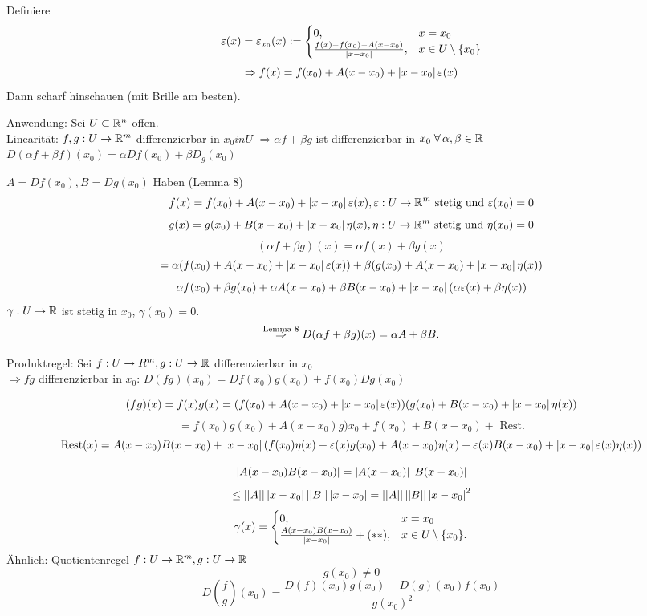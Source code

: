 \documentclass[../ana2.tex]{subfiles}
\begin{document}
\begin{bew}
    Definiere 
    \[ \varepsilon(x) = \varepsilon_{x_0}(x) 
    := \begin{cases}
        0, & x = x_0 \\
        \frac{f(x) - f(x_0) - A(x - x_0)}{\left|x - x_0\right|}, & x\in U \setminus \{x_0\}
    \end{cases} \]
    \[ \Rightarrow f(x) = f(x_0) + A(x - x_0) + \left|x - x_0\right| \varepsilon(x) \]
    Dann scharf hinschauen (mit Brille am besten).
\end{bew}
Anwendung: Sei \( U \subset \mathbb{R}^n \) offen. \\
Linearität: \( f,g:U\rightarrow \mathbb{R}^m \) differenzierbar in \(x_0 in U\)
\( \Rightarrow \alpha f + \beta g \) ist differenzierbar in 
\(x_0 \; \forall \alpha, \beta \in \R\) \\
\( D(\alpha f + \beta f)(x_0) = \alpha Df(x_0) + \beta D_g(x_0) \)
\begin{bew}
    \( A = Df (x_0), B = Dg(x_0) \)
    Haben (Lemma 8) 
    \[ f(x) = f(x_0) + A(x - x_0) + \left|x - x_0\right|\varepsilon(x), 
    \varepsilon:U\rightarrow \mathbb{R}^m \text{ stetig und } \varepsilon(x_0) = 0 \]
    \[ g(x) = g(x_0) + B(x - x_0) + \left|x - x_0\right|\eta(x), 
    \eta:U\rightarrow \mathbb{R}^m \text{ stetig und } \eta(x_0) = 0 \]
    \[ (\alpha f +\beta g)(x) 
    = \alpha f(x) + \beta g(x) \]
    \[ = \alpha (f(x_0) + A(x - x_0) + \left|x - x_0\right|\varepsilon(x)) 
    + \beta (g(x_0) + A(x - x_0) + \left|x - x_0\right|\eta(x)) \]
    \[ \alpha f(x_0) + \beta g(x_0) + \alpha A(x-x_0)+\beta B(x-x_0) + \left|x-x_0\right|
    (\alpha \varepsilon(x) + \beta \eta(x)) \]
    \( \gamma:U\rightarrow \mathbb{R} \) ist stetig in \(x_0\), 
    \( \gamma(x_0) = 0 \).
    \[ \overset{\text{Lemma 8}}{\Rightarrow} 
    D(\alpha f + \beta g)(x) = \alpha A + \beta B. \]
\end{bew}
Produktregel: Sei \( f:U\rightarrow R^m, g:U\rightarrow \mathbb{R} \)
differenzierbar in \(x_0\) \\
\( \Rightarrow  fg \) differenzierbar in \(x_0\): 
\( D(fg)(x_0) = Df(x_0)g(x_0) + f(x_0)Dg(x_0) \)
\begin{bew}
    \[ (fg)(x) = f(x)g(x) 
    = (f(x_0) + A(x - x_0) + \left|x - x_0\right|\varepsilon(x)) 
    (g(x_0) + B(x - x_0) + \left|x - x_0\right|\eta(x))  \]
    \[ = f(x_0)g(x_0) + A(x - x_0) g)x_0 
    + f(x_0) + B(x - x_0) + \text{ Rest.} \]
    \[\mathrm{Rest}(x) = A(x-x_0)B(x-x_0) + \left|x-x_0\right|
    (f(x_0)\eta(x) + \varepsilon(x)g(x_0) + A(x-x_0)\eta(x)
    + \varepsilon(x)B(x-x_0) + \left|x-x_0\right| \varepsilon(x)\eta(x))\]

    \[ \left| A(x - x_0) B(x - x_0) \right| 
    = \left|A (x- x_0)\right|\left|B(x-x_0)\right| \]
    \[ \leq \left|\left|A\right|\right|\left|x-x_0\right| \left|\left|B\right|\right|\left|x - x_0\right|
    = \left|\left|A\right|\right| \left|\left|B\right|\right| \left|x - x_0\right|^2 \]
    \[ \gamma(x) = \begin{cases}
        0, &x = x_0\\
        \frac{A(x - x_0)B(x - x_0)}{\left|x - x_0\right|} + (**), &x \in U \setminus \{x_0\}.
    \end{cases} \]
    Ähnlich: Quotientenregel \( f:U\rightarrow \mathbb{R}^m, g:U\rightarrow \mathbb{R} \)
    \[ g(x_0) \neq 0 \]
    \[ D(\frac{f}{g})(x_0) 
    = \frac{D(f)(x_0) g(x_0) - D(g)(x_0) f(x_0)}{g(x_0)^2} \]
\end{bew}
\end{document}

